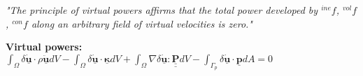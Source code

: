 \begin{center}
\emph{"The principle of virtual powers affirms that the total power developed by $^{ine}f$, $^{vol}f$, $^{con}f$ along an arbitrary field of virtual velocities is zero."}
\end{center}

\textbf{Virtual powers:} \\
$\int_\Omega \delta \underline{\mathbf{\dot{u}}} \cdot \rho \underline{\mathbf{\ddot{u}}} dV - \int_\Omega \delta \underline{\mathbf{\dot{u}}} \cdot \underline{\mathbf{\kappa}} dV + \int_\Omega \nabla \delta \underline{\mathbf{\dot{u}}} : \underline{\underline{\mathbf{P}}}dV - \int_{\Gamma_p} \delta \underline{\mathbf{\dot{u}}} \cdot \underline{\mathbf{p}}dA = 0$ \\